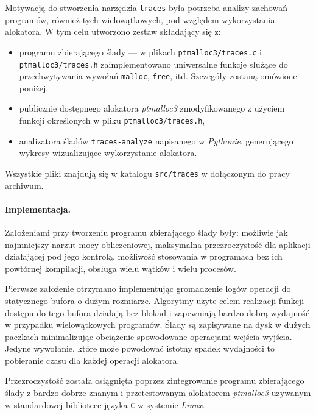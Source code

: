\documentclass[12pt,a4paper,titlepage,twoside]{mwart}
\begin{document}
Motywacją do stworzenia narzędzia \texttt{traces} była potrzeba analizy
zachowań programów, również tych wielowątkowych, pod względem wykorzystania
alokatora. W tym celu utworzono zestaw składający się z:
\begin{itemize}
\item programu zbierającego ślady --- w plikach \texttt{ptmalloc3/traces.c} i
\texttt{ptmalloc3/traces.h} zaimplementowano uniwersalne funkcje służące
do przechwytywania wywołań \texttt{malloc}, \texttt{free}, itd. Szczegóły
zostaną omówione poniżej.
\item publicznie dostępnego alokatora \textit{ptmalloc3} zmodyfikowanego z
użyciem funkcji określonych w pliku \texttt{ptmalloc3/traces.h},
\item analizatora śladów \texttt{traces-analyze} napisanego w
\textit{Pythonie}, generującego wykresy wizualizujące wykorzystanie alokatora.
\end{itemize}
Wszystkie pliki znajdują się w katalogu \texttt{src/traces} w dołączonym do
pracy archiwum.

\paragraph{Implementacja.} Założeniami przy tworzeniu programu zbierającego
ślady były: możliwie jak najmniejszy narzut mocy obliczeniowej, maksymalna
przezroczystość dla aplikacji działającej pod jego kontrolą, możliwość
stosowania w programach bez ich powtórnej kompilacji, obsługa wielu wątków i
wielu procesów.

Pierwsze założenie otrzymano implementując gromadzenie logów operacji do
statycznego bufora o dużym rozmiarze. Algorytmy użyte celem realizacji funkcji
dostępu do tego bufora działają bez blokad i zapewniają bardzo dobrą wydajność
w przypadku wielowątkowych programów. Ślady są zapisywane na dysk w dużych
paczkach minimalizując obciążenie spowodowane operacjami wejścia-wyjścia.
Jedyne wywołanie, które może powodować istotny spadek wydajności to pobieranie
czasu dla każdej operacji alokatora.

Przezroczystość została osiągnięta poprzez zintegrowanie programu zbierającego
ślady z bardzo dobrze znanym i przetestowanym alokatorem \textit{ptmalloc3}
używanym w standardowej bibliotece języka \verb+C+ w systemie \textit{Linux}.
\end{document}
